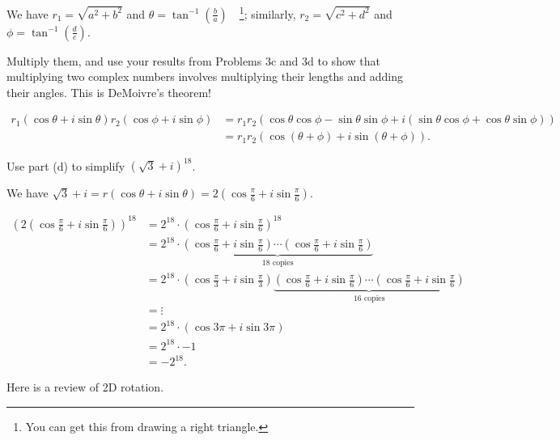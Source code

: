 \documentclass[../gatm_answers.tex]{subfiles}
\begin{document}
\noindent We have $r_1=\sqrt{a^2+b^2}$ and $\theta=\tan^{-1}\left(\frac{b}{a}\right)\quad$\footnote{You can get this from drawing a right triangle.}; similarly, $r_2=\sqrt{c^2+d^2}$ and $\phi=\tan^{-1}\left(\frac{d}{c}\right)$.

\begin{inner_problem}
\item Multiply them, and use your results from Problems 3c and 3d to show that multiplying two complex numbers involves multiplying their lengths and adding their angles. This is DeMoivre's theorem!
\end{inner_problem}

\begin{align*}
r_1(\cos\theta + i\sin\theta)r_2(\cos\phi + i\sin\phi) &= r_1r_2(\cos\theta\cos\phi - \sin\theta\sin\phi + i(\sin\theta\cos\phi + \cos\theta\sin\phi)) \\
&= r_1r_2(\cos(\theta+\phi) + i \sin(\theta+\phi)).
\end{align*}

\begin{inner_problem}
\item Use part (d) to simplify $(\sqrt{3}+i)^{18}$.
\end{inner_problem}

\noindent We have $\sqrt{3}+i=r(\cos\theta + i\sin\theta) = 2\left(\cos\frac{\pi}{6} + i\sin\frac{\pi}{6}\right)$.

\begin{align*}
(2\left(\cos\frac{\pi}{6} + i\sin\frac{\pi}{6}\right))^{18} &= 2^{18} \cdot \left(\cos\frac{\pi}{6} + i\sin\frac{\pi}{6}\right)^{18} \\
&= 2^{18}\cdot \underbrace{\left(\cos\frac{\pi}{6} + i\sin\frac{\pi}{6}\right)\cdots \left(\cos\frac{\pi}{6} + i\sin\frac{\pi}{6}\right)}_{18\text{ copies}} \\
&= 2^{18}\cdot \left(\cos\frac{\pi}{3} + i\sin\frac{\pi}{3}\right) \underbrace{\left(\cos\frac{\pi}{6} + i\sin\frac{\pi}{6}\right)\cdots \left(\cos\frac{\pi}{6} + i\sin\frac{\pi}{6}\right)}_{16\text{ copies}} \\
&= \vdots \\
&= 2^{18}\cdot \left(\cos 3\pi + i\sin 3\pi\right) \\
&= 2^{18}\cdot -1 \\
&= -2^{18}.
\end{align*}

\begin{outer_problem}
\item Here is a review of 2D rotation.
\end{outer_problem}
\end{document}
